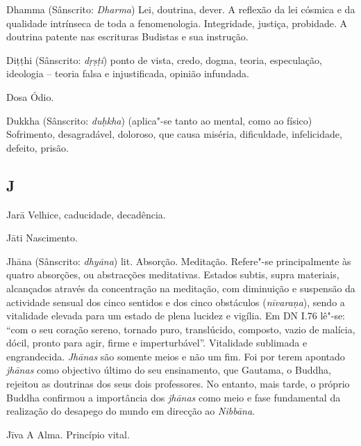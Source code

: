 \begin{glossarydescription}

\item[Dhamma] (Sânscrito: \emph{Dharma}) Lei, doutrina, dever. A reflexão da
lei cósmica e da qualidade intrínseca de toda a fenomenologia. Integridade,
justiça, probidade. A doutrina patente nas escrituras Budistas e sua
instrução.

\item[Diṭṭhi] (Sânscrito: \emph{dṛṣṭi}) ponto de vista, credo, dogma, teoria,
especulação, ideologia -- teoria falsa e injustificada, opinião infundada.

\item[Dosa] Ódio.

\item[Dukkha] (Sânscrito: \emph{duḥkha}) (aplica"-se tanto ao mental, como ao
físico) Sofrimento, desagradável, doloroso, que causa miséria, dificuldade,
infelicidade, defeito, prisão.

\end{glossarydescription}

\subsection{J}

\begin{glossarydescription}

\item[Jarā] Velhice, caducidade, decadência.

\item[Jāti] Nascimento.

\item[Jhāna] (Sânscrito: \emph{dhyāna}) lit. Absorção. Meditação. Refere"-se
principalmente às quatro absorções, ou abstracções meditativas. Estados subtis,
supra materiais, alcançados através da concentração na meditação, com diminuição
e suspensão da actividade sensual dos cinco sentidos e dos cinco obstáculos
(\emph{nīvaraṇa}), sendo a vitalidade elevada para um estado de plena lucidez e
vigília. Em DN I.76 lê"-se: ``com o seu coração sereno, tornado puro, translúcido,
composto, vazio de malícia, dócil, pronto para agir, firme e imperturbável''.
Vitalidade sublimada e engrandecida. \emph{Jhānas} são somente meios e não um
fim. Foi por terem apontado \emph{jhānas} como objectivo último do seu
ensinamento, que Gautama, o Buddha, rejeitou as doutrinas dos seus dois
professores. No entanto, mais tarde, o próprio Buddha confirmou a importância
dos \emph{jhānas} como meio e fase fundamental da realização do desapego do
mundo em direcção ao \emph{Nibbāna}.

\item[Jīva] A Alma. Princípio vital.

\end{glossarydescription}

